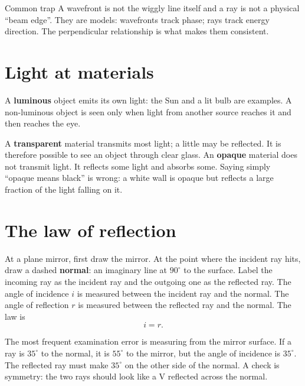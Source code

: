 \documentclass[10pt,a4paper]{article}
\begin{document}
\begin{keybox}{Common trap}
A wavefront is not the wiggly line itself and a ray is not a physical ``beam edge''. They are models: wavefronts track phase; rays track energy direction. The perpendicular relationship is what makes them consistent.
\end{keybox}

\section{Light at materials}
A \textbf{luminous} object emits its own light: the Sun and a lit bulb are examples. A non-luminous object is seen only when light from another source reaches it and then reaches the eye.

A \textbf{transparent} material transmits most light; a little may be reflected. It is therefore possible to see an object through clear glass. An \textbf{opaque} material does not transmit light. It reflects some light and absorbs some. Saying simply ``opaque means black'' is wrong: a white wall is opaque but reflects a large fraction of the light falling on it.

\section{The law of reflection}
At a plane mirror, first draw the mirror. At the point where the incident ray hits, draw a dashed \textbf{normal}: an imaginary line at $90^\circ$ to the surface. Label the incoming ray as the incident ray and the outgoing one as the reflected ray. The angle of incidence $i$ is measured between the incident ray and the normal. The angle of reflection $r$ is measured between the reflected ray and the normal. The law is
\[\boxed{i=r}.\]

The most frequent examination error is measuring from the mirror surface. If a ray is $35^\circ$ to the normal, it is $55^\circ$ to the mirror, but the angle of incidence is $35^\circ$. The reflected ray must make $35^\circ$ on the other side of the normal. A check is symmetry: the two rays should look like a V reflected across the normal.

\begin{center}\end{center}
\end{document}
